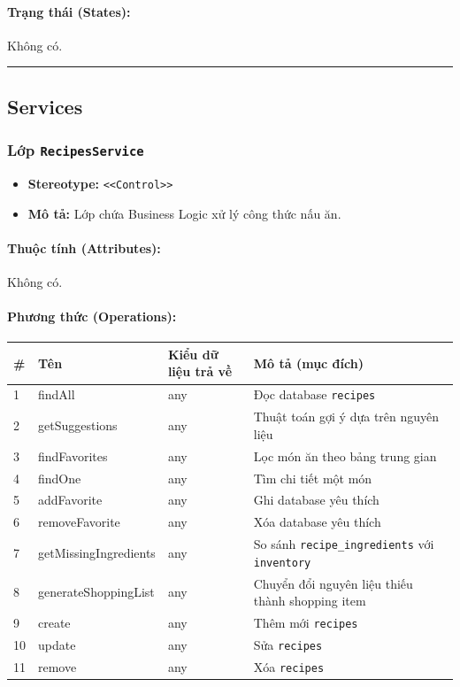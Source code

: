 \documentclass[12pt,a4paper]{article}
\begin{document}
\paragraph{Trạng thái (States):}
Không có.

\vskip 0.5cm
\noindent\rule{\textwidth}{0.5pt}
\vskip 0.5cm

\subsection{Services}

\subsubsection{Lớp \texttt{RecipesService}}
\begin{itemize}[leftmargin=*]
    \item \textbf{Stereotype:} \texttt{\textless{}\textless{}Control\textgreater{}\textgreater{}}
    \item \textbf{Mô tả:} Lớp chứa Business Logic xử lý công thức nấu ăn.
\end{itemize}

\paragraph{Thuộc tính (Attributes):}
Không có.

\paragraph{Phương thức (Operations):}
\begin{longtable}{|p{0.6cm}|p{3.8cm}|p{2.6cm}|p{6.5cm}|}
\hline
\textbf{\#} & \textbf{Tên} & \textbf{Kiểu dữ liệu trả về} & \textbf{Mô tả (mục đích)} \\ \hline
\endhead
1 & findAll & any & Đọc database \texttt{recipes} \\ \hline
2 & getSuggestions & any & Thuật toán gợi ý dựa trên nguyên liệu \\ \hline
3 & findFavorites & any & Lọc món ăn theo bảng trung gian \\ \hline
4 & findOne & any & Tìm chi tiết một món \\ \hline
5 & addFavorite & any & Ghi database yêu thích \\ \hline
6 & removeFavorite & any & Xóa database yêu thích \\ \hline
7 & getMissingIngredients & any & So sánh \texttt{recipe\_ingredients} với \texttt{inventory} \\ \hline
8 & generateShoppingList & any & Chuyển đổi nguyên liệu thiếu thành shopping item \\ \hline
9 & create & any & Thêm mới \texttt{recipes} \\ \hline
10 & update & any & Sửa \texttt{recipes} \\ \hline
11 & remove & any & Xóa \texttt{recipes} \\ \hline
\end{longtable}
\end{document}
